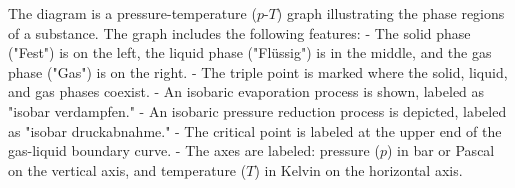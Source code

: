 The diagram is a pressure-temperature (\( p \)-\( T \)) graph illustrating the phase regions of a substance. The graph includes the following features:  
- The solid phase ("Fest") is on the left, the liquid phase ("Flüssig") is in the middle, and the gas phase ("Gas") is on the right.  
- The triple point is marked where the solid, liquid, and gas phases coexist.  
- An isobaric evaporation process is shown, labeled as "isobar verdampfen."  
- An isobaric pressure reduction process is depicted, labeled as "isobar druckabnahme."  
- The critical point is labeled at the upper end of the gas-liquid boundary curve.  
- The axes are labeled: pressure (\( p \)) in bar or Pascal on the vertical axis, and temperature (\( T \)) in Kelvin on the horizontal axis.